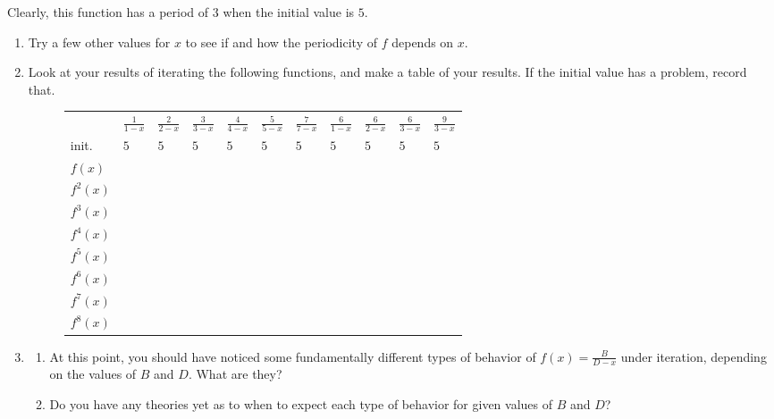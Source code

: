 \documentclass[../gatm.tex]{subfiles}
\begin{document}
\noindent Clearly, this function has a period of $3$ when the initial value is $5$.
\begin{enumerate}
\setcounter{enumi}{\value{problem_i}}
\item Try a few other values for $x$ to see if and how the periodicity of $f$ depends on $x$.
\item Look at your results of iterating the following functions, and make a table of your results. If the initial value has a problem, record that.

\begin{figure}[h]
	\begin{center}
		\begin{minipage}[b]{\textwidth}
			\centering
			\renewcommand*{\arraystretch}{1.25}
			\begin{tabular}{l|llllllllll}
				\hline
				& $\frac{1}{1-x}$ & $\frac{2}{2-x}$ & $\frac{3}{3-x}$ & $\frac{4}{4-x}$ & $\frac{5}{5-x}$ & $\frac{7}{7-x}$ & $\frac{6}{1-x}$ & $\frac{6}{2-x}$ & $\frac{6}{3-x}$ & $\frac{9}{3-x}$ \\
				\rowcolor{light-gray}
				init.    & $5$   & $5$   & $5$ & $5$ & $5$ & $5$ & $5$ & $5$ & $5$ & $5$ \\
				$f(x)$   &       &       &   &   &   &   &   &   &   &   \\
				\rowcolor{light-gray}
				$f^2(x)$ &       &       &   &   &   &   &   &   &   &   \\
				$f^3(x)$ &       &       &   &   &   &   &   &   &   &   \\
				\rowcolor{light-gray}
				$f^4(x)$ &       &       &   &   &   &   &   &   &   &   \\
				$f^5(x)$ &       &       &   &   &   &   &   &   &   &   \\
				\rowcolor{light-gray}
				$f^6(x)$ &       &       &   &   &   &   &   &   &   &   \\
				$f^7(x)$ &       &       &   &   &   &   &   &   &   &   \\
				\rowcolor{light-gray}
				$f^8(x)$ &       &       &   &   &   &   &   &   &   &   \\ \hline
			\end{tabular}
			\vspace*{0.5\baselineskip}
		\end{minipage}
	\end{center}
	\vspace*{-2\baselineskip}
\end{figure}

\item \begin{enumerate}
\item At this point, you should have noticed some fundamentally different types of behavior of $f(x)=\frac{B}{D-x}$ under iteration, depending on the values of $B$ and $D$. What are they?
\item Do you have any theories yet as to when to expect each type of behavior for given values of $B$ and $D$?
\end{enumerate}
\setcounter{problem_i}{\value{enumi}}
\end{enumerate}
\end{document}
